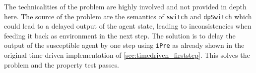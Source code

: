 The technicalities of the problem are highly involved and not provided in depth here. The source of the problem are the semantics of \texttt{switch} and \texttt{dpSwitch} which could lead to a delayed output of the agent state, leading to inconsistencies when feeding it back as environment in the next step. The solution is to delay the output of the susceptible agent by one step using \texttt{iPre} as already shown in the original time-driven implementation of \ref{sec:timedriven_firststep}. This solves the problem and the property test passes. 

%
%
%
